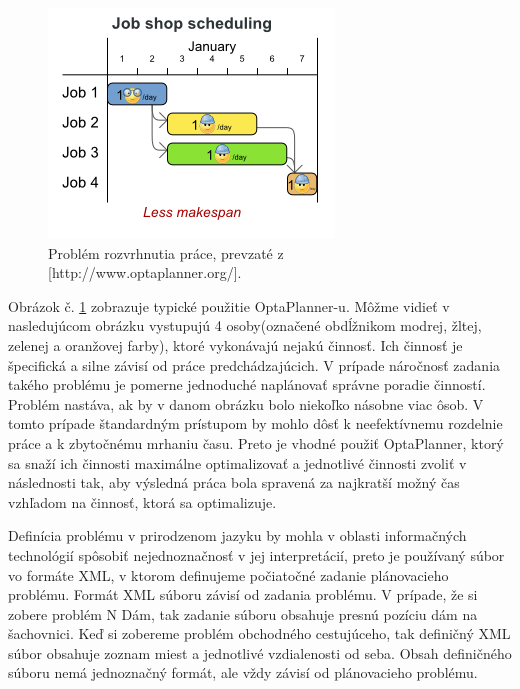 \begin{figure}[htb]

\begin{center}

\includegraphics[scale=0.8]{fig/useCaseOverview.jpg} 
\caption{Problém rozvrhnutia práce, prevzaté z [http://www.optaplanner.org/]. }
\label{obrazokUseCase}

\end{center}

\end{figure}
Obrázok č. \ref{obrazokUseCase} zobrazuje typické použitie OptaPlanner-u. Môžme vidieť v nasledujúcom obrázku vystupujú 4 osoby(označené obdĺžnikom modrej, žltej, zelenej a oranžovej farby), ktoré vykonávajú nejakú činnosť. Ich činnosť je špecifická a silne závisí od práce predchádzajúcich. V prípade náročnosť zadania takého problému je pomerne jednoduché naplánovať správne poradie činností. Problém nastáva, ak by v danom obrázku bolo niekoľko násobne viac ôsob. V tomto prípade štandardným prístupom by mohlo dôsť k neefektívnemu rozdelnie práce a k zbytočnému mrhaniu času. Preto je vhodné použiť OptaPlanner, ktorý sa snaží ich činnosti maximálne optimalizovať a jednotlivé činnosti zvoliť v následnosti tak, aby výsledná práca bola spravená za najkratší možný čas vzhľadom na činnosť, ktorá sa optimalizuje.

Definícia problému v prirodzenom jazyku by mohla v oblasti informačných technológií spôsobiť nejednoznačnosť v jej interpretácií, preto je používaný súbor vo formáte XML, v ktorom definujeme počiatočné zadanie  plánovacieho problému. Formát XML súboru závisí od zadania problému. V prípade, že si zobere problém N Dám, tak zadanie súboru obsahuje presnú pozíciu dám na šachovnici. Keď si zobereme problém obchodného cestujúceho, tak definičný XML súbor obsahuje zoznam miest a jednotlivé vzdialenosti od seba. Obsah definičného súboru nemá jednoznačný formát, ale vždy závisí od plánovacieho problému.


